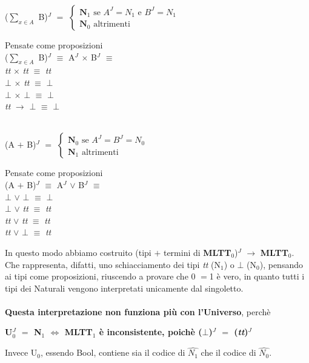 \begin{enumerate}
\begin{center}
($\sum\limits_{x \in A}$ B)$^J$ $=$
$
\begin{cases}
\textbf{N}_1\text{ se } A^J =  N_1  \text{ e } B^J = N_1\\
\textbf{N}_0 \text{ altrimenti}
\end{cases}
$
\end{center}
\noindent
Pensate come proposizioni \\
($\sum\limits_{x \in A}$ B)$^J$ $\equiv$ A$^J$ $\times$ B$^J$ $\equiv$\\
\textit{tt} $\times$ \textit{tt} $\equiv$ \textit{tt}\\
$\bot$ $\times$ \textit{tt} $\equiv$ $\bot$  \\
$\bot$ $\times$ $\bot$ $\equiv$ $\bot$ \\
\textit{tt} $\rightarrow$ $\bot$ $\equiv$ $\bot$\\\\

\begin{center}
(A $+$ B)$^J$ $=$
$
\begin{cases}
\textbf{N}_0\text{ se } A^J = B^J = N_0\\
\textbf{N}_1 \text{ altrimenti}
\end{cases}
$
\end{center}
\noindent
Pensate come proposizioni \\
(A $+$ B)$^J$ $\equiv$ A$^J$ $\vee$ B$^J$ $\equiv$\\
$\bot$  $\vee$ $\bot$  $\equiv$ $\bot$ \\
$\bot$ $\vee$ \textit{tt} $\equiv$ \textit{tt}  \\
\textit{tt} $\vee$ \textit{tt} $\equiv$ \textit{tt} \\
\textit{tt} $\vee$ $\bot$ $\equiv$ \textit{tt}

\end{enumerate}
\noindent
In questo modo abbiamo costruito (tipi $+$ termini di \textbf{MLTT$_0$})$^J$ $\rightarrow$ \textbf{MLTT$_0$}. Che rappresenta, difatti, uno schiacciamento dei tipi \textit{tt} (N$_1$) o $\bot$ (N$_0$), pensando ai tipi come proposizioni, riuscendo a provare che 0 $=$1 \`e vero, in quanto tutti i tipi dei Naturali vengono interpretati unicamente dal singoletto.\\\\
\noindent
\textbf{Questa interpretazione non funziona pi\`u con l'Universo}, perch\`e
\begin{center}\textbf{U$_0^J$  $=$ N$_1$ $\Leftrightarrow$ MLTT$_1$ \`e inconsistente, poich\`e ($\bot$)$^J$ $=$ (\textit{tt})$^J$} \end{center}
Invece U$_0$, essendo Bool, contiene sia il codice di $\hat{N_1}$ che il codice di $\hat{N_0}$.

